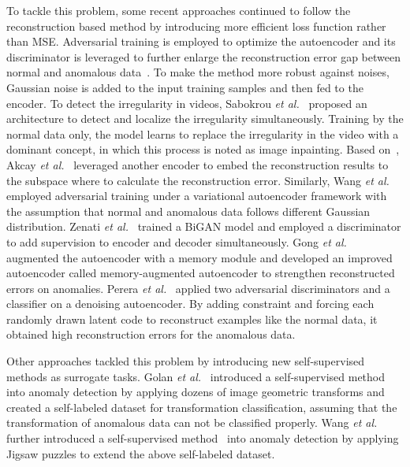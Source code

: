\documentclass[journal]{IEEEtran}
\begin{document}
To tackle this problem, some recent approaches continued to follow the reconstruction based method by introducing more efficient loss function rather than MSE. Adversarial training is employed to optimize the autoencoder and its discriminator is leveraged to further enlarge the reconstruction error gap between normal and anomalous data~\cite{Sabokrou2018Adversarially,sabokrou2020deep}. To make the method more robust against noises, Gaussian noise is added to the input training samples and then fed to the encoder. To detect the irregularity in videos, Sabokrou \emph{et al.}~\cite{sabokrou2018avid} proposed an architecture to detect and localize the irregularity simultaneously. Training by the normal data only, the model learns to replace the irregularity in the video with a dominant concept, in which this process is noted as image inpainting. 
Based on~\cite{Sabokrou2018Adversarially}, Akcay \emph{et al.}~\cite{akccay2019skip} leveraged another encoder to embed the reconstruction results to the subspace where to calculate the reconstruction error. Similarly, Wang \emph{et al.}~\cite{wang2019advae} employed adversarial training under a variational autoencoder framework with the assumption that normal and anomalous data follows different Gaussian distribution. 
Zenati \emph{et al.}~\cite{zenati2018efficient} trained a BiGAN model and employed a discriminator to add supervision to encoder and decoder simultaneously.
Gong \emph{et al.}~\cite{gong2019memorizing} augmented the autoencoder with a memory module and developed an improved autoencoder called memory-augmented autoencoder to strengthen reconstructed errors on anomalies. Perera \emph{et al.}~\cite{perera2019ocgan} applied two adversarial discriminators and a classifier on a denoising autoencoder. By adding constraint and forcing each randomly drawn latent code to reconstruct examples like the normal data, it obtained high reconstruction errors for the anomalous data.

Other approaches tackled this problem by introducing new self-supervised methods as surrogate tasks. Golan \emph{et al.}~\cite{golan2018deep} introduced a self-supervised method \cite{gidaris2018unsupervised} into anomaly detection by applying dozens of image geometric transforms and created a self-labeled dataset for transformation classification, assuming that the transformation of anomalous data can not be classified properly. Wang \emph{et al.}~\cite{wang2019effective} further introduced a self-supervised method~\cite{noroozi2016unsupervised} into anomaly detection by applying Jigsaw puzzles to extend the above self-labeled dataset.
\end{document}
